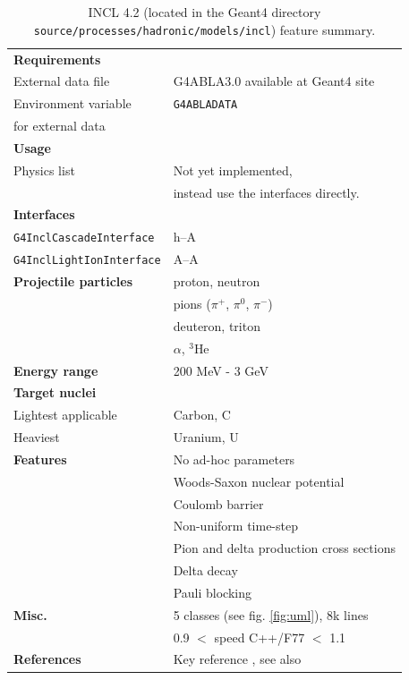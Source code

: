 \begin{table}[ht]
  \caption{INCL 4.2 (located in the Geant4
    directory {\tt source/\-processes/\-hadronic/\-models/\-incl})
    feature summary.}
\label{tbl:inclsummary}
\vskip1cm
\begin{center}
\begin{tabular}{l|l}
\hline
{\bf Requirements} & \\
External data file & G4ABLA3.0 available at Geant4 site \\
Environment variable & {\tt G4ABLADATA} \\ 
for external data & \\
\hline
{\bf Usage}      & \\
Physics list     & Not yet implemented, \\
                 & instead use the interfaces directly. \\
\hline
{\bf Interfaces} &     \\
{\tt G4InclCascadeInterface} &  h--A \\
{\tt G4InclLightIonInterface} &  A--A \\
\hline
{\bf Projectile particles} & proton, neutron \\
                 & pions ($\pi^+$, $\pi^0$, $\pi^-$) \\
                 & deuteron, triton \\ 
                 & $\alpha$, $^3$He \\ 
\hline
{\bf Energy range} & 200 MeV - 3 GeV \\
\hline
{\bf Target nuclei} & \\
Lightest applicable & Carbon, C \\
Heaviest            & Uranium, U \\
\hline
{\bf Features} & No ad-hoc parameters \\
                    & Woods-Saxon nuclear potential \\
                    & Coulomb barrier \\
                    & Non-uniform time-step \\
                    & Pion and delta production cross sections \\
                    & Delta decay \\
                    & Pauli blocking \\
\hline
{\bf Misc.}         & 5 classes (see fig. \ref{fig:uml}), 8k lines \\
                    & 0.9 $<$ speed C++/F77 $<$ 1.1 \\
\hline
{\bf References}    & Key reference \cite{Boudard02a}, see also \cite{Cugnon97a, Cugnon81a, Cugnon87a, Cugnon89a} \\
\hline
\end{tabular}
\end{center}
\end{table}


